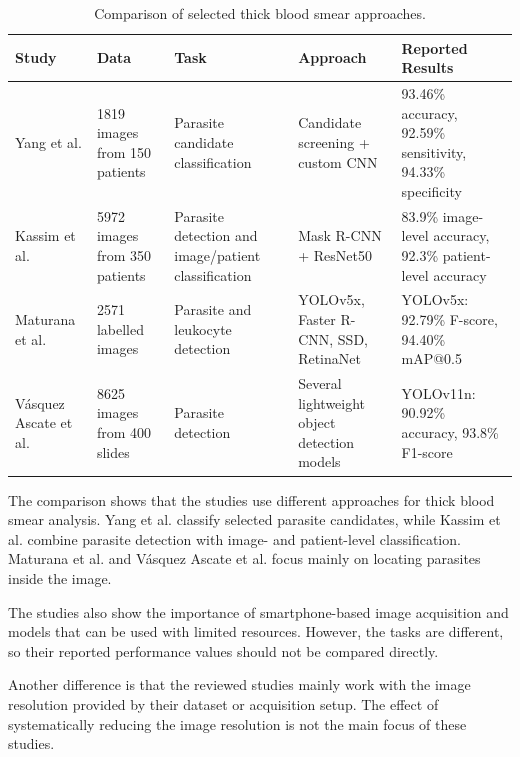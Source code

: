 \begin{table}[htbp]
\centering
\small
\caption{Comparison of selected thick blood smear approaches.}
\label{tab:comparison_relevant_approaches}

\begin{tabularx}{\textwidth}{|p{2.5cm}|X|X|X|X|}
\hline
\textbf{Study} &
\textbf{Data} &
\textbf{Task} &
\textbf{Approach} &
\textbf{Reported Results} \\
\hline

Yang et al. \cite{Yang2020} &
1819 images from 150 patients &
Parasite candidate classification &
Candidate screening + custom CNN &
93.46\% accuracy, 92.59\% sensitivity, 94.33\% specificity \\
\hline

Kassim et al. \cite{Kassim2021} &
5972 images from 350 patients &
Parasite detection and image/patient classification &
Mask R-CNN + ResNet50 &
83.9\% image-level accuracy, 92.3\% patient-level accuracy \\
\hline

Maturana et al. \cite{Maturana2023} &
2571 labelled images &
Parasite and leukocyte detection &
YOLOv5x, Faster R-CNN, SSD, RetinaNet &
YOLOv5x: 92.79\% F-score, 94.40\% mAP@0.5 \\
\hline

Vásquez Ascate et al. \cite{VasquezAscate2026} &
8625 images from 400 slides &
Parasite detection &
Several lightweight object detection models &
YOLOv11n: 90.92\% accuracy, 93.8\% F1-score \\
\hline

\end{tabularx}
\end{table}

\FloatBarrier

The comparison shows that the studies use different approaches for thick blood smear analysis. Yang et al. classify selected parasite candidates, while Kassim et al. combine parasite detection with image- and patient-level classification. Maturana et al. and Vásquez Ascate et al. focus mainly on locating parasites inside the image.

The studies also show the importance of smartphone-based image acquisition and models that can be used with limited resources. However, the tasks are different, so their reported performance values should not be compared directly.

Another difference is that the reviewed studies mainly work with the image resolution provided by their dataset or acquisition setup. The effect of systematically reducing the image resolution is not the main focus of these studies.

